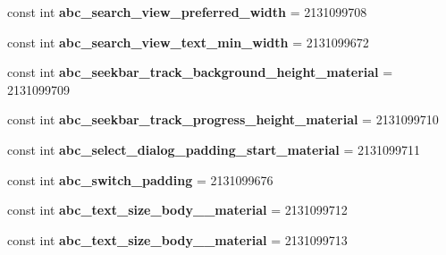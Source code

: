 \begin{DoxyCompactItemize}
const int {\bfseries abc\+\_\+search\+\_\+view\+\_\+preferred\+\_\+width} = 2131099708
\item 
\mbox{\label{class_pinned_app_1_1_droid_1_1_resource_1_1_dimension_a3019652474b06f0a3fcaa99bb226542c}} 
const int {\bfseries abc\+\_\+search\+\_\+view\+\_\+text\+\_\+min\+\_\+width} = 2131099672
\item 
\mbox{\label{class_pinned_app_1_1_droid_1_1_resource_1_1_dimension_a5d3cce27cff81412e11da2611ada076d}} 
const int {\bfseries abc\+\_\+seekbar\+\_\+track\+\_\+background\+\_\+height\+\_\+material} = 2131099709
\item 
\mbox{\label{class_pinned_app_1_1_droid_1_1_resource_1_1_dimension_ac40d3a2e6a12be2890afcaef6fc92888}} 
const int {\bfseries abc\+\_\+seekbar\+\_\+track\+\_\+progress\+\_\+height\+\_\+material} = 2131099710
\item 
\mbox{\label{class_pinned_app_1_1_droid_1_1_resource_1_1_dimension_ab88c610782f0f6e0f563bfbdab1ea40c}} 
const int {\bfseries abc\+\_\+select\+\_\+dialog\+\_\+padding\+\_\+start\+\_\+material} = 2131099711
\item 
\mbox{\label{class_pinned_app_1_1_droid_1_1_resource_1_1_dimension_a01e750db8237ed66d832a87768d4e70d}} 
const int {\bfseries abc\+\_\+switch\+\_\+padding} = 2131099676
\item 
\mbox{\label{class_pinned_app_1_1_droid_1_1_resource_1_1_dimension_ae1d136126d989cf21379145ab2c4d0d1}} 
const int {\bfseries abc\+\_\+text\+\_\+size\+\_\+body\+\_\+\_\+material} = 2131099712
\item 
\mbox{\label{class_pinned_app_1_1_droid_1_1_resource_1_1_dimension_aa347055be95ed7d411232e893383325c}} 
const int {\bfseries abc\+\_\+text\+\_\+size\+\_\+body\+\_\+\_\+material} = 2131099713
\item 
\mbox{\label{class_pinned_app_1_1_droid_1_1_resource_1_1_dimension_aa4085bad9dad04edd0cafcc9427d9b9c}} 

\end{DoxyCompactItemize}
